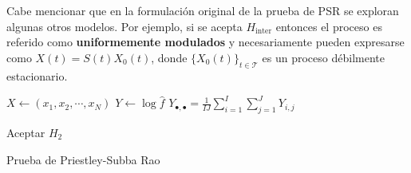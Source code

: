 Cabe mencionar que en la formulación original de la prueba de PSR se exploran algunas otros 
modelos. 
%
Por ejemplo, si se acepta $H_{\text{inter}}$ entonces el proceso es referido como
\textbf{uniformemente modulados} y necesariamente pueden expresarse como $X(t) = S(t) X_0(t)$, 
donde $\{X_0(t)\}_{t\in \mathcal{T}}$ es un proceso débilmente estacionario.

\begin{algorithm}
\DontPrintSemicolon
{}

$ X \leftarrow \left(x_1, x_2, \cdots, x_N \right)$\;
$Y \leftarrow \log{\widehat{f}}$\;
$Y_{\bullet,\bullet} = \frac{1}{I J} \sum_{i=1}^{I} \sum_{j=1}^{J} Y_{i,j}$ \;

Aceptar $H_2$ \;

\caption{Prueba de Priestley-Subba Rao}
\label{algoritmo_stationarity}
\end{algorithm}

